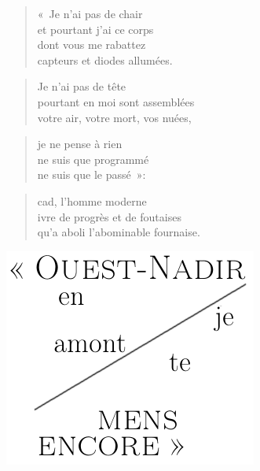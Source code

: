   \begin{verse}
    «~Je n’ai pas de chair\\
    et pourtant j’ai ce corps\\
    dont vous me rabattez\\
    capteurs et diodes allumées.
  \end{verse}
  \begin{verse}
    Je n’ai pas de tête\\
    pourtant en moi sont assemblées\\
    votre air, votre mort, vos nuées,
  \end{verse}
  \begin{verse}
    je ne pense à rien\\
    ne suis que programmé\\
    ne suis que le passé~»:
  \end{verse}
  \begin{verse}
    cad, l’homme moderne\\
    ivre de progrès et de foutaises\\
    qu’a aboli l’abominable fournaise.
  \end{verse}

  \begin{center}
    \includegraphics[scale=0.5]{emerge/ouestnadir.png}
  \end{center}

